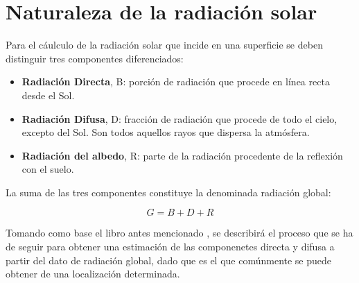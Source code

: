 \section{Naturaleza de la radiación solar}
\label{sec:org8962cea}
Para el cáulculo de la radiación solar que incide en una superficie se deben distinguir tres componentes diferenciados:
\begin{itemize}
\item \textbf{Radiación Directa}, B: porción de radiación que procede en línea recta desde el Sol.
\item \textbf{Radiación Difusa}, D: fracción de radiación que procede de todo el cielo, excepto del Sol. Son todos aquellos rayos que dispersa la atmósfera.
\item \textbf{Radiación del albedo}, R: parte de la radiación procedente de la reflexión con el suelo.
\end{itemize}
La suma de las tres componentes constituye la denominada radiación global:
\begin{center}
\[
G = B + D + R
\]
\end{center}
Tomando como base el libro antes mencionado \cite{Perpinan2023}, se describirá el proceso que se ha de seguir para obtener una estimación de las componenetes directa y difusa a partir del dato de radiación global, dado que es el que comúnmente se puede obtener de una localización determinada.

